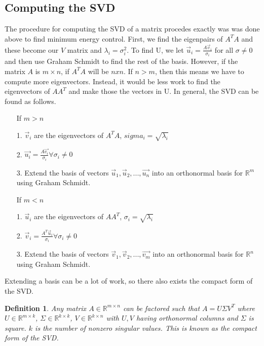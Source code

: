 \documentclass{article}
\newtheorem{definition}{Definition}
\begin{document}
\subsection{Computing the SVD}
The procedure for computing the SVD of a matrix procedes exactly was was done above to find minimum energy control.
First, we find the eigenpairs of $A^TA$ and these become our $V$ matrix and $\lambda_i=\sigma_i^2$. To find U, we let $\vec{u}_i=\frac{A\vec{v}_i}{\sigma_i}$ for all $\sigma \ne 0$ and then use Graham Schmidt to find the rest of the basis.
However, if the matrix $A$ is $m \times n$, if $A^TA$ will be $n x n$. If $n > m$, then this means we have to compute more eigenvectors. Instead, it would be less work to find the eigenvectors of $AA^T$ and make those the vectors in U.
In general, the SVD can be found as follows.
\begin{itemize}
    \item[] If $m > n$
    \item[1. ] $\vec{v}_i$ are the eigenvectors of $A^TA$, $sigma_i=\sqrt{\lambda_i}$
    \item[2. ] $\vec{u_i}=\frac{A\vec{v_i}}{\sigma_i} \forall \sigma_i \ne 0$
    \item[3. ] Extend the basis of vectors ${\vec{u}_1, \vec{u}_2, ..., \vec{u_n}}$ into an orthonormal basis for $\mathbb{R}^m$ using Graham Schmidt.
    \item[] If $m < n$
    \item[1. ] $\vec{u}_i$ are the eigenvectors of $AA^T$, $\sigma_i=\sqrt{\lambda_i}$
    \item[2. ] $\vec{v}_i=\frac{A^T\vec{u}_i}{\sigma_i} \forall \sigma_i \ne 0$
    \item[3. ] Extend the basis of vectors ${\vec{v}_1, \vec{v}_2, ..., \vec{v_m}}$ into an orthonormal basis for $\mathbb{R}^n$ using Graham Schmidt.
\end{itemize}
Extending a basis can be a lot of work, so there also exists the compact form of the SVD.
\begin{definition}
    Any matrix $A\in \mathbb{R}^{m\times n}$ can be factored such that $A = U\Sigma V^T$
     where $U\in \mathbb{R}^{m\times k}$, $\Sigma \in \mathbb{R}^{k \times k}$, $V\in \mathbb{R}^{k \times n}$
     with $U,V$ having orthonormal columns and $\Sigma$ is square. $k$ is the number of nonzero singular values.
     This is known as the compact form of the SVD.
\end{definition}
\end{document}
